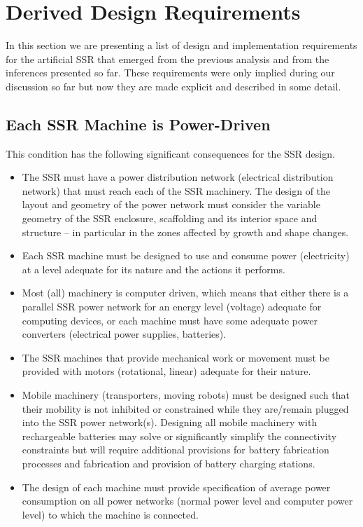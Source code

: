 \section{Derived Design Requirements}

In this section we are presenting a list of design and implementation
requirements for the artificial SSR that emerged from the previous
analysis and from the inferences presented so far. These requirements
were only implied during our discussion so far but now they are made
explicit and described in some detail.

\subsection[Each SSR Machine is Power{}-Driven]{Each SSR Machine is
Power-Driven}

This condition has the following significant consequences for the SSR design.

\begin{itemize}
\item The SSR must have a power distribution network (electrical
distribution network) that must reach each of the SSR machinery. The
design of the layout and geometry of the power network must consider
the variable geometry of the SSR enclosure, scaffolding and its
interior space and structure – in particular in the zones affected by
growth and shape changes.
\item Each SSR machine must be designed to use and consume power
(electricity) at a level adequate for its nature and the actions it
performs. 
\item Most (all) machinery is computer driven, which means that either
there is a parallel SSR power network for an energy level (voltage)
adequate for computing devices, or each machine must have some adequate
power converters (electrical power supplies, batteries).
\item The SSR machines that provide mechanical work or movement must be
provided with motors (rotational, linear) adequate for their nature.
\item Mobile machinery (transporters, moving robots) must be designed
such that their mobility is not inhibited or constrained while they
are/remain plugged into the SSR power network(s).  Designing all mobile
machinery with rechargeable batteries may solve or significantly
simplify the connectivity constraints but will require additional
provisions for battery fabrication processes and fabrication and
provision of battery charging stations.
\item The design of each machine must provide specification of average
power consumption on all power networks (normal power level and
computer power level) to which the machine is connected.
\end{itemize}

